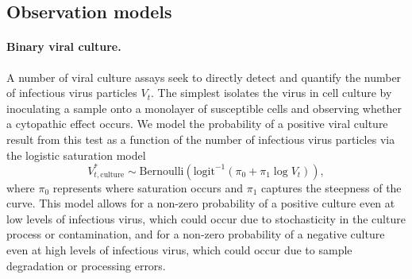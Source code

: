 \documentclass[12pt]{article}
\begin{document}
\subsection{Observation models}

\paragraph{Binary viral culture.} A number of viral culture assays seek to directly detect and quantify the number of infectious virus particles $V_t$. The simplest isolates the virus in cell culture by inoculating a sample onto a monolayer of susceptible cells and observing whether a cytopathic effect occurs. We model the probability of a positive viral culture result from this test as a function of the number of infectious virus particles via the logistic saturation model
\begin{equation*}
    V^{*}_{t,\text{culture}} \sim \text{Bernoulli}(\text{logit}^{-1}(\pi_0 + \pi_1 \log V_t)),
\end{equation*}
where $\pi_0$ represents where saturation occurs and $\pi_1$ captures the steepness of the curve. This model allows for a non-zero probability of a positive culture even at low levels of infectious virus, which could occur due to stochasticity in the culture process or contamination, and for a non-zero probability of a negative culture even at high levels of infectious virus, which could occur due to sample degradation or processing errors.
\end{document}
